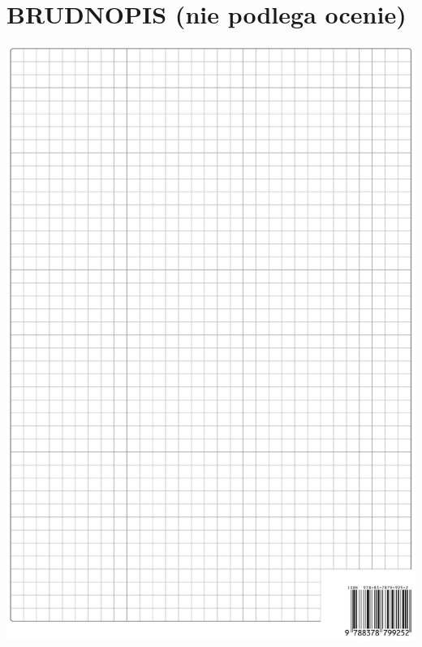 \documentclass[10pt]{article}
\begin{document}
\section*{BRUDNOPIS (nie podlega ocenie)}
\begin{center}
\includegraphics[max width=\textwidth]{2024_11_21_d15133c79177ee6989d3g-12}
\end{center}
\end{document}
